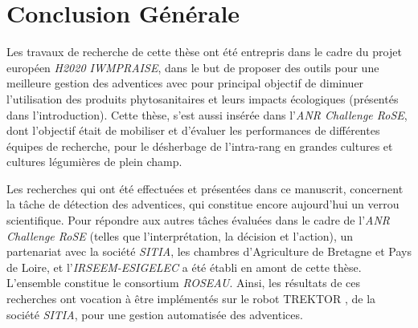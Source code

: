 \documentclass[../thesis.tex]{subfiles}
\begin{document}
    \chapter{Conclusion Générale}
    
    
    Les travaux de recherche de cette thèse ont été entrepris dans le cadre du projet européen \textit{H2020 IWMPRAISE}, dans le but de proposer des outils pour une meilleure gestion des adventices avec pour principal objectif de diminuer l'utilisation des produits phytosanitaires et leurs impacts écologiques (présentés dans l'introduction). Cette thèse, s'est aussi insérée dans l'\textit{ANR Challenge RoSE}, dont l'objectif était de mobiliser et d'évaluer les performances de différentes équipes de recherche, pour le désherbage de l'intra-rang en grandes cultures et cultures légumières de plein champ. %
    
    Les recherches qui ont été effectuées et présentées dans ce manuscrit, concernent la tâche de détection des adventices, qui constitue encore aujourd'hui un verrou scientifique. Pour répondre aux autres tâches évaluées dans le cadre de l'\textit{ANR Challenge RoSE} (telles que l'interprétation, la décision et l'action), un partenariat avec la société \textit{SITIA}, les chambres d'Agriculture de Bretagne et Pays de Loire, et l'\textit{IRSEEM-ESIGELEC} a été établi en amont de cette thèse. L'ensemble constitue le consortium \textit{ROSEAU}. Ainsi, les résultats de ces recherches ont  vocation à être implémentés sur le robot \og TREKTOR \fg, de la société \textit{SITIA}, pour une gestion automatisée des adventices.
    
    
\end{document}
